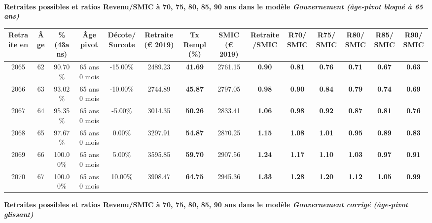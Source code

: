 ~\\{\bf \noindent Retraites possibles et ratios Revenu/SMIC à 70, 75, 80, 85, 90 ans dans le modèle \emph{Gouvernement (âge-pivot bloqué à 65 ans)}}  
 
\begin{adjustbox}{max width=\textwidth} 
\begin{tabular}[htb]{|c|c||c|c|c||c|c||c|c||c|c|c|c|c|} 
\hline 
 Retraite en &  Âge &  \%(43ans) &  Âge pivot &  Décote/Surcote &  Retraite (\euro{} 2019) &  Tx Rempl(\%) &  SMIC (\euro{} 2019) &  Retraite/SMIC &  R70/SMIC &  R75/SMIC &  R80/SMIC &  R85/SMIC &  R90/SMIC \\ 
\hline \hline 
 2065 &  62 &  90.70\% &  65 ans 0 mois &  -15.00\% &  2489.23 &  {\bf 41.69} &  2761.15 &  {\bf {\color{red} 0.90}} &  {\bf {\color{red} 0.81}} &  {\bf {\color{red} 0.76}} &  {\bf {\color{red} 0.71}} &  {\bf {\color{red} 0.67}} &  {\bf {\color{red} 0.63}} \\ 
\hline 
 2066 &  63 &  93.02\% &  65 ans 0 mois &  -10.00\% &  2744.89 &  {\bf 45.87} &  2797.05 &  {\bf {\color{red} 0.98}} &  {\bf {\color{red} 0.90}} &  {\bf {\color{red} 0.84}} &  {\bf {\color{red} 0.79}} &  {\bf {\color{red} 0.74}} &  {\bf {\color{red} 0.69}} \\ 
\hline 
 2067 &  64 &  95.35\% &  65 ans 0 mois &  -5.00\% &  3014.35 &  {\bf 50.26} &  2833.41 &  {\bf 1.06} &  {\bf {\color{red} 0.98}} &  {\bf {\color{red} 0.92}} &  {\bf {\color{red} 0.87}} &  {\bf {\color{red} 0.81}} &  {\bf {\color{red} 0.76}} \\ 
\hline 
 2068 &  65 &  97.67\% &  65 ans 0 mois &  0.00\% &  3297.91 &  {\bf 54.87} &  2870.25 &  {\bf 1.15} &  {\bf 1.08} &  {\bf 1.01} &  {\bf {\color{red} 0.95}} &  {\bf {\color{red} 0.89}} &  {\bf {\color{red} 0.83}} \\ 
\hline 
 2069 &  66 &  100.00\% &  65 ans 0 mois &  5.00\% &  3595.85 &  {\bf 59.70} &  2907.56 &  {\bf 1.24} &  {\bf 1.17} &  {\bf 1.10} &  {\bf 1.03} &  {\bf {\color{red} 0.97}} &  {\bf {\color{red} 0.91}} \\ 
\hline 
 2070 &  67 &  100.00\% &  65 ans 0 mois &  10.00\% &  3908.47 &  {\bf 64.75} &  2945.36 &  {\bf 1.33} &  {\bf 1.28} &  {\bf 1.20} &  {\bf 1.12} &  {\bf 1.05} &  {\bf {\color{red} 0.99}} \\ 
\hline 
\hline 
\end{tabular} 
\end{adjustbox} 
 
 \vspace{0.1cm} 
{\bf \noindent Retraites possibles et ratios Revenu/SMIC à 70, 75, 80, 85, 90 ans dans le modèle \emph{Gouvernement corrigé (âge-pivot glissant)}}  
 
